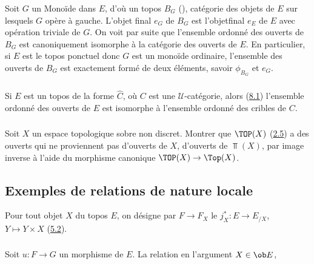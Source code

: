 \documentclass[10pt]{../fichiers-configuration-latex/smfart}
\begin{document}
\subsubsection{}
Soit $G$ un Monoïde dans $E$, d'où un topos $B_G$
(), catégorie des objets de $E$ sur lesquels $G$
opère à gauche. L'objet final $e_G$ de $B_G$ est
l'objet\pageoriginale final $e_E$ de $E$ avec opération triviale de
$G$. On voit par suite que l'ensemble ordonné des ouverts de $B_G$
est canoniquement isomorphe à la catégorie des ouverts de $E$. En
particulier, si $E$ est le topos ponctuel donc $G$ est un monoïde
ordinaire, l'ensemble des ouverts de $B_G$ est exactement formé de
deux éléments, savoir $\phi_{B_G}$ et $e_G$.

\subsubsection{}
Si $E$ est un topos de la forme $\widehat{C}$, où $C$ est une
$𝒰$-catégorie, alors (\hyperref[IV.subsec8.1]{8.1}) l'ensemble ordonné
des ouverts de $E$ est isomorphe à l'ensemble ordonné des cribles de
$C$.

\subsubsection{}
Soit $X$ un espace topologique sobre non discret. Montrer que
$\TOP(X)$ (\hyperref[IV.subsec2.5]{2.5}) a des ouverts qui ne proviennent pas
d'ouverts de $X$, \ie d'ouverts de $\Top(X)$, par image inverse à
l'aide du morphisme canonique  $\TOP(X)\rightarrow
\Top(X)$.

\subsection{Exemples de relations de nature locale}

Pour tout objet $X$ du topos $E$, on désigne par $F\rightarrow F_X$
le  $j^{\ast}_X:E\rightarrow
E_{/X}$, $Y\mapsto Y\times X$ (\hyperref[IV.subsec5.2]{5.2}).

\subsubsection{}
Soit $u:F\rightarrow G$ un morphisme de $E$. La relation en
l'argument $X\in \ob E$,
\end{document}
